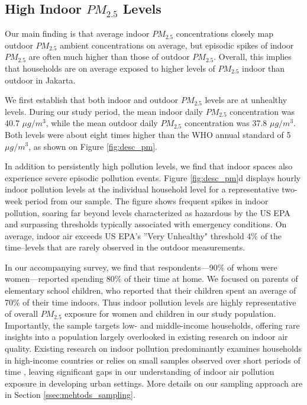 \documentclass[reqno,12pt,notitlepage]{article}
\begin{document}
\subsection{High Indoor $PM_{2.5}$ Levels}

Our main finding is that average indoor $PM_{2.5}$ concentrations closely map outdoor $PM_{2.5}$ ambient concentrations on average, but episodic spikes of indoor $PM_{2.5}$ are often much higher than those of outdoor $PM_{2.5}$. Overall, this implies that households are on average exposed to higher levels of $PM_{2.5}$ indoor than outdoor in Jakarta.

We first establish that both  indoor and outdoor $PM_{2.5}$ levels are at unhealthy levels. During our study period, the mean indoor daily $PM_{2.5}$ concentration was 40.7 $\mu g/m^3$, while the mean outdoor daily $PM_{2.5}$ concentration was 37.8 $\mu g/m^3$. Both levels were about eight times higher than the WHO annual standard of 5 $\mu g/m^3$, as shown on Figure \ref{fig:desc_pm}.

In addition to persistently high pollution levels, we find that indoor spaces also experience severe episodic pollution events. Figure \ref{fig:desc_pm}d displays hourly indoor pollution levels at the individual household level for a representative two-week period from our sample. The figure shows frequent spikes in indoor pollution, soaring far beyond levels characterized as hazardous by the US EPA and surpassing thresholds typically associated with emergency conditions. On average, indoor air exceeds US EPA's ''Very Unhealthy" threshold 4\% of the time--levels that are rarely observed in the outdoor measurements. 

In our accompanying survey, we find that respondents—90\% of whom were women—reported spending 80\% of their time at home. We focused on parents of elementary school children, who reported that their children spent an average of 70\% of their time indoors. Thus indoor pollution levels are highly representative of overall $PM_{2.5}$ exposure for women and children in our study population. Importantly, the sample targets low- and middle-income households, offering rare insights into a population largely overlooked in existing research on indoor air quality. Existing research on indoor pollution predominantly examines households in high-income countries \citep{krebs_using_2021, lunderberg_assessing_2023, burke_exposures_2022} or relies on small samples observed over short periods of time \citep{lim_comparing_2022}, leaving significant gaps in our understanding of indoor air pollution exposure in developing urban settings. More details on our sampling approach are in Section \ref{ssec:mehtods_sampling}.
\end{document}

